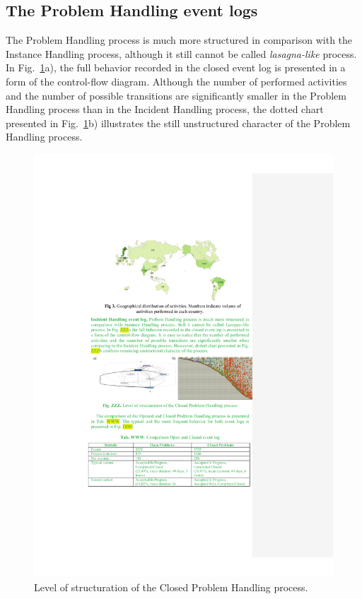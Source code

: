 \documentclass[lnbip]{svmultln}
\begin{document}
\subsection{The Problem Handling event logs}
The Problem Handling process is much more structured in comparison with the Instance Handling process, although it still cannot be called \emph{lasagna-like} process. In Fig.~\ref{fig:structuredClosedProblem}a), the full behavior recorded in the closed event log is presented in a form of the control-flow diagram. Although the number of performed activities and the number of possible transitions are significantly smaller in the Problem Handling process than in the Incident Handling process, the dotted chart presented in Fig.~\ref{fig:structuredClosedProblem}b) illustrates the still unstructured character of the Problem Handling process.


\begin{figure}
\centering
\includegraphics[width=\textwidth]{"figs/pic 4"}
\caption{Level of structuration of the Closed Problem Handling process.}
\label{fig:structuredClosedProblem}
\end{figure}
\end{document}
